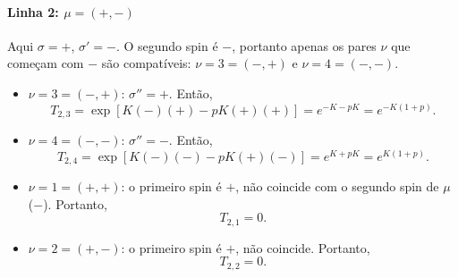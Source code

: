\documentclass[11pt,a4paper]{article}
\begin{document}
\paragraph{Linha 2: \(\mu = (+,-)\)}
%
Aqui \(\sigma = +\), \(\sigma' = -\). O segundo spin é \(-\), portanto apenas os pares \(\nu\) que começam com \(-\) são compatíveis: \(\nu = 3 = (-,+)\) e \(\nu = 4 = (-,-)\).
%
\begin{itemize}
    \item \(\nu = 3 = (-,+)\): \(\sigma'' = +\). Então,
    \begin{equation}
        T_{2,3} = \exp\left[ K(-)(+) - pK(+)(+) \right] = e^{-K - pK} = e^{-K(1+p)}.
    \end{equation}
    
    \item \(\nu = 4 = (-,-)\): \(\sigma'' = -\). Então,
    \begin{equation}
        T_{2,4} = \exp\left[ K(-)(-) - pK(+)(-) \right] = e^{K + pK} = e^{K(1+p)}.
    \end{equation}
    
    \item \(\nu = 1 = (+,+)\): o primeiro spin é \(+\), não coincide com o segundo spin de \(\mu\) (\(-\)). Portanto,
    \begin{equation}
        T_{2,1} = 0.
    \end{equation}
    
    \item \(\nu = 2 = (+,-)\): o primeiro spin é \(+\), não coincide. Portanto,
    \begin{equation}
        T_{2,2} = 0.
    \end{equation}
\end{itemize}
%
\end{document}

